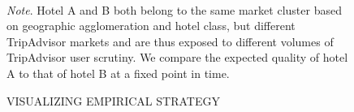 \documentclass[mksc,blindrev]{informs3} %
\begin{document}
\begin{figure}[htp]
 \caption{VISUALIZING EMPIRICAL STRATEGY}
 	 \label{fig:schematic}
\centering
{}%
\\
\bigskip 
\begin{flushleft}
\small \textit{Note}. Hotel A and B both belong to the same market cluster based on geographic agglomeration and hotel class, but different TripAdvisor markets and are thus exposed to different volumes of TripAdvisor user scrutiny. We compare the expected quality of hotel A to that of hotel B at a fixed point in time. 
\end{flushleft}

\end{figure}
\clearpage

\end{document}
